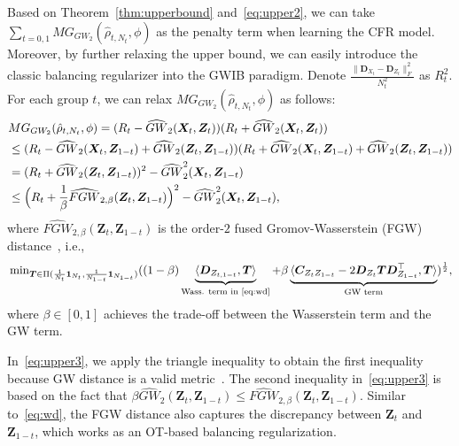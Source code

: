 \documentclass{article}
\begin{document}
Based on Theorem~\ref{thm:upperbound} and~\eqref{eq:upper2}, we can take $\sum_{t=0,1}MG_{GW_2}(\hat{\rho}_{t,N_t},\phi)$ as the penalty term when learning the CFR model. 
Moreover, by further relaxing the upper bound, we can easily introduce the classic balancing regularizer into the GWIB paradigm.
Denote $\frac{\|\bm{D}_{X_t}-\bm{D}_{Z_t}\|_F^2}{N_t^2}$ as $R_t^2$.
For each group $t$, we can relax $MG_{GW_2}(\hat{\rho}_{t,N_t},\phi)$ as follows: 
\begin{eqnarray}\label{eq:upper3}
\begin{aligned}
    &MG_{GW_2}(\hat{\rho}_{t,N_t},\phi)=(R_t-\widehat{GW}_2(\bm{X}_{t},\bm{Z}_{t}))(R_t+\widehat{GW}_2(\bm{X}_{t},\bm{Z}_{t}))\\
    &\leq (R_t-\widehat{GW}_2(\bm{X}_{t},\bm{Z}_{1-t})+\widehat{GW}_2(\bm{Z}_{t},\bm{Z}_{1-t}))(R_t+\widehat{GW}_2(\bm{X}_{t},\bm{Z}_{1-t})+\widehat{GW}_2(\bm{Z}_{t},\bm{Z}_{1-t}))\\
    &=(R_t + \widehat{GW}_2(\bm{Z}_{t},\bm{Z}_{1-t}))^2-\widehat{GW}_2^2(\bm{X}_{t},\bm{Z}_{1-t})\\
    &\leq \Bigl(R_t + \frac{1}{\beta}\widehat{FGW}_{2,\beta}(\bm{Z}_{t},\bm{Z}_{1-t})\Bigr)^2-\widehat{GW}_2^2(\bm{X}_{t},\bm{Z}_{1-t}),
\end{aligned}
\end{eqnarray}
where $\widehat{FGW}_{2,\beta}(\bm{Z}_{t},\bm{Z}_{1-t})$ is the order-$2$ fused Gromov-Wasserstein (FGW) distance~\cite{titouan2019optimal}, i.e., 
\begin{eqnarray}\label{eq:fgwd}
    \sideset{}{_{\bm{T}\in\Pi(\frac{1}{N_t}\bm{1}_{N_t},\frac{1}{N_{1-t}}\bm{1}_{N_{1-t}})}}\min((1-\beta)\underbrace{\langle\bm{D}_{Z_{t,1-t}},\bm{T}\rangle}_{\text{Wass. term in~\eqref{eq:wd}}}+\beta\underbrace{\langle\bm{C}_{Z_tZ_{1-t}}-2\bm{D}_{Z_t}\bm{T}\bm{D}_{Z_{1-t}}^{\top},\bm{T}\rangle}_{\text{GW term}})^{\frac{1}{2}},
\end{eqnarray}
where $\beta\in [0,1]$ achieves the trade-off between the Wasserstein term and the GW term.

In~\eqref{eq:upper3}, we apply the triangle inequality to obtain the first inequality because GW distance is a valid metric~\cite{memoli2011gromov}.
The second inequality in~\eqref{eq:upper3} is based on the fact that $\beta \widehat{GW}_2(\bm{Z}_{t},\bm{Z}_{1-t})\leq \widehat{FGW}_{2,\beta}(\bm{Z}_{t},\bm{Z}_{1-t})$.
Similar to~\eqref{eq:wd}, the FGW distance also captures the discrepancy between $\bm{Z}_t$ and $\bm{Z}_{1-t}$, which works as an OT-based balancing regularization.
\end{document}
